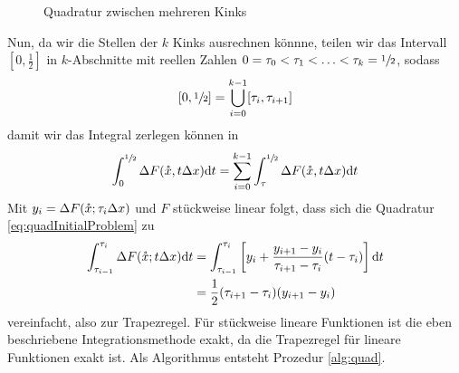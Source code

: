 \begin{figure}[H]
\centering
 
 \caption{Quadratur zwischen mehreren Kinks}
\label{fig:quadrature} 
\end{figure}
Nun, da wir die Stellen der $k$ Kinks ausrechnen könnne, teilen wir das Intervall $[0,\frac{1}{2}]$ in $k$-Abschnitte mit reellen Zahlen $0=\tau_0<\tau_1<\ldots<\tau_k = \sfrac{1}{2}$,  sodass
\[
 [0,\sfrac{1}{2}] = \bigcup_{i=0}^{k-1} [\tau_i,\tau_{i+1}]
\]
damit wir das Integral zerlegen können in
\[
 \int_0^{\sfrac{1}{2}} \Delta F(\mathring{x},t\Delta x) \text{d}t = \sum_{i=0}^{k-1} \int_\tau^{\sfrac{1}{2}} \Delta F(\mathring{x},t\Delta x) \text{d}t
\]
Mit $y_i = \Delta F(\mathring{x};\tau_i \Delta x)$ und $F$ stückweise linear folgt, dass sich die Quadratur \ref{eq:quadInitialProblem} zu
\begin{equation}
\begin{aligned}
 \int_{\tau_{i-1}}^{\tau_i} \Delta F(\mathring{x};t\Delta x) \text{d}t &= \int_{\tau_{i-1}}^{\tau_i}\left[ y_i+ \frac{y_{i+1}-y_i}{\tau_{i+1}-\tau_i}(t-\tau_i) \right] \text{d}t \\
 &=\frac{1}{2}(\tau_{i+1} -\tau_i)(y_{i+1}-y_i)
 \end{aligned}
\end{equation}
vereinfacht, also zur Trapezregel. Für stückweise lineare Funktionen ist die eben beschriebene Integrationsmethode exakt, da die Trapezregel für lineare Funktionen exakt ist.
Als Algorithmus entsteht Prozedur \ref{alg:quad}.
